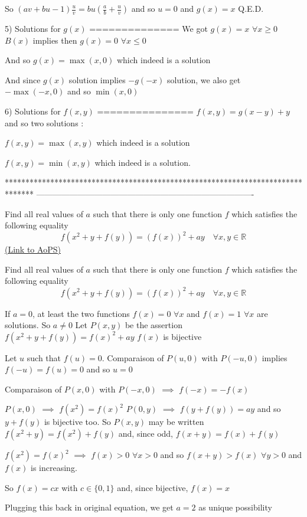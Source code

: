 \begin{solution}
So $(av+bu-1)\frac uv=bu(\frac ab+\frac uv)$ and so $u=0$ and $g(x)=x$
Q.E.D.

5) Solutions for $g(x)$
==============
We got $g(x)=x$ $\forall x\ge 0$ 
$B(x)$ implies then $g(x)=0$ $\forall x\le 0$

And so $g(x)=\max(x,0)$ which indeed is a solution

And since $g(x)$ solution implies $-g(-x)$ solution, we also get $-\max(-x,0)$ and so $\min(x,0)$

6) Solutions for $f(x,y)$
===============
$f(x,y)=g(x-y)+y$ and so two solutions :

$\boxed{f(x,y)=\max(x,y)}$ which indeed is a solution

$\boxed{f(x,y)=\min(x,y)}$ which indeed is a solution.
\end{solution}
*******************************************************************************
-------------------------------------------------------------------------------

\begin{problem}
	Find all real values ​​of $a$ such that there is only one function $f$ which satisfies the following equality \[f (x ^ 2 + y + f (y)) = (f (x)) ^ 2 + ay \quad\forall x,y\in\mathbb R\]
	\flushright \href{https://artofproblemsolving.com/community/c6h566437}{(Link to AoPS)}
\end{problem}



\begin{solution}
	\begin{tcolorbox}Find all real values ​​of $a$ such that there is only one function $f$ which satisfies the following equality \[f (x ^ 2 + y + f (y)) = (f (x)) ^ 2 + ay \quad\forall x,y\in\mathbb R\]\end{tcolorbox}
If $a=0$, at least the two functions $f(x)=0$ $\forall x$ and $f(x)=1$ $\forall x$ are solutions. So $a\ne 0$
Let $P(x,y)$ be the assertion $f(x^2+y+f(y))=f(x)^2+ay$
$f(x)$ is bijective

Let $u$ such that $f(u)=0$. Comparaison of $P(u,0)$ with $P(-u,0)$ implies $f(-u)=f(u)=0$ and so $u=0$

Comparaison of $P(x,0)$ with $P(-x,0)$ $\implies$ $f(-x)=-f(x)$

$P(x,0)$ $\implies$ $f(x^2)=f(x)^2$
$P(0,y)$ $\implies$ $f(y+f(y))=ay$ and so $y+f(y)$ is bijective too.
So $P(x,y)$ may be written $f(x^2+y)=f(x^2)+f(y)$ and, since odd, $f(x+y)=f(x)+f(y)$

$f(x^2)=f(x)^2$ $\implies$ $f(x)>0$ $\forall x>0$ and so $f(x+y)>f(x)$ $\forall y>0$ and $f(x)$ is increasing.

So $f(x)=cx$ with $c\in\{0,1\}$ and, since bijective, $f(x)=x$

Plugging this back in original equation, we get $\boxed{a=2}$ as unique possibility
\end{solution}




